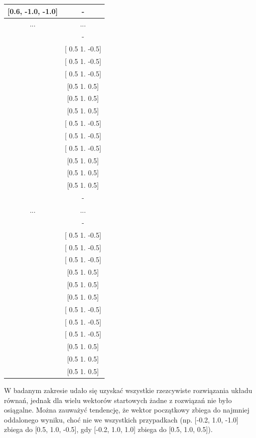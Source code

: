 \documentclass{article}
\begin{document}
\begin{table}[H]
\begin{tabular}{|c|c|}
[0.6, -1.0, -1.0] & - \\ \hline
... & ... \\ \hline
[0.6, 0.2, 1.0] & - \\ \hline
[0.6, 0.6, -1.0] & [ 0.5  1.  -0.5] \\ \hline
[0.6, 0.6, -0.6] & [ 0.5  1.  -0.5] \\ \hline
[0.6, 0.6, -0.2] & [ 0.5  1.  -0.5] \\ \hline
[0.6, 0.6, 0.2] & [0.5 1.  0.5] \\ \hline
[0.6, 0.6, 0.6] & [0.5 1.  0.5] \\ \hline
[0.6, 0.6, 1.0] & [0.5 1.  0.5] \\ \hline
[0.6, 1.0, -1.0] & [ 0.5  1.  -0.5] \\ \hline
[0.6, 1.0, -0.6] & [ 0.5  1.  -0.5] \\ \hline
[0.6, 1.0, -0.2] & [ 0.5  1.  -0.5] \\ \hline
[0.6, 1.0, 0.2] & [0.5 1.  0.5] \\ \hline
[0.6, 1.0, 0.6] & [0.5 1.  0.5] \\ \hline
[0.6, 1.0, 1.0] & [0.5 1.  0.5] \\ \hline
[1.0, -1.0, -1.0] & - \\ \hline
... & ... \\ \hline
[1.0, 0.2, 1.0] & - \\ \hline
[1.0, 0.6, -1.0] & [ 0.5  1.  -0.5] \\ \hline
[1.0, 0.6, -0.6] & [ 0.5  1.  -0.5] \\ \hline
[1.0, 0.6, -0.2] & [ 0.5  1.  -0.5] \\ \hline
[1.0, 0.6, 0.2] & [0.5 1.  0.5] \\ \hline
[1.0, 0.6, 0.6] & [0.5 1.  0.5] \\ \hline
[1.0, 0.6, 1.0] & [0.5 1.  0.5] \\ \hline
[1.0, 1.0, -1.0] & [ 0.5  1.  -0.5] \\ \hline
[1.0, 1.0, -0.6] & [ 0.5  1.  -0.5] \\ \hline
[1.0, 1.0, -0.2] & [ 0.5  1.  -0.5] \\ \hline
[1.0, 1.0, 0.2] & [0.5 1.  0.5] \\ \hline
[1.0, 1.0, 0.6] & [0.5 1.  0.5] \\ \hline
[1.0, 1.0, 1.0] & [0.5 1.  0.5] \\ \hline
\end{tabular}
\end{table}

W badanym zakresie udało się uzyskać wszystkie rzezcywiste rozwiązania układu równań, jednak dla wielu wektorów startowych żadne z rozwiązań
nie było osiągalne. Można zauważyć tendencję, że wektor początkowy zbiega do najmniej oddalonego wyniku, choć nie we wszystkich
przypadkach (np. [-0.2, 1.0, -1.0] zbiega do [0.5, 1.0, -0.5], gdy [-0.2, 1.0, 1.0] zbiega do [0.5, 1.0, 0.5]).
\end{document}
